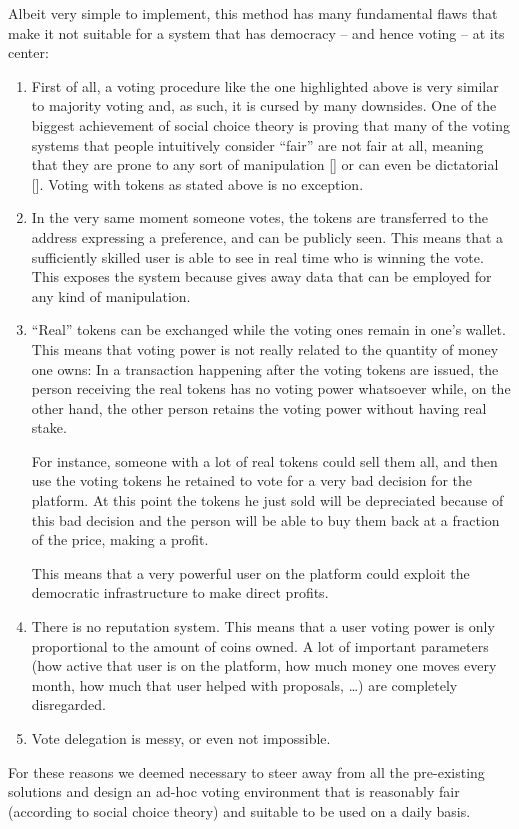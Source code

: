 \documentclass[submission, copyright,creativecommons,sharealike,noncommercial]{eptcs}
\begin{document}
	Albeit very simple to implement, this method has many fundamental flaws that make it not suitable for a system that has democracy -- and hence voting -- at its center:
	\begin{enumerate}	
		\item First of all, a voting procedure like the one highlighted above is very similar to majority voting and, as such, it is cursed by many downsides. One of the biggest achievement of social choice theory is proving that many of the voting systems that people intuitively consider ``fair'' are not fair at all, meaning that they are prone to any sort of manipulation [] or can even be dictatorial []. Voting with tokens as stated above is no exception. 
		\item In the very same moment someone votes, the tokens are transferred to the address expressing a preference, and can be publicly seen. This means that a sufficiently skilled user is able to see in real time who is winning the vote. This exposes the system because gives away data that can be employed for any kind of manipulation.
		\item ``Real'' tokens can be exchanged while the voting ones remain in one's wallet. This means that voting power is not really related to the quantity of money one owns: In a transaction happening after the voting tokens are issued, the person receiving the real tokens has no voting power whatsoever while, on the other hand, the other person retains the voting power without having real stake.
		
		For instance, someone with a lot of real tokens could sell them all, and then use the voting tokens he retained to vote for a very bad decision for the platform. At this point the tokens he just sold will be depreciated because of this bad decision and the person will be able to buy them back at a fraction of the price, making a profit. 
		
		This means that a very powerful user on the platform could exploit the democratic infrastructure to make direct profits.
		\item There is no reputation system. This means that a user voting power is only proportional to the amount of coins owned. A lot of important parameters (how active that user is on the platform, how much money one moves every month, how much that user helped with proposals, \dots) are completely disregarded.
		\item Vote delegation is messy, or even not impossible.
	\end{enumerate}
%
	For these reasons we deemed necessary to steer away from all the pre-existing solutions and design an ad-hoc voting environment that is reasonably fair (according to social choice theory) and suitable to be used on a daily basis.
%
%
\end{document}
